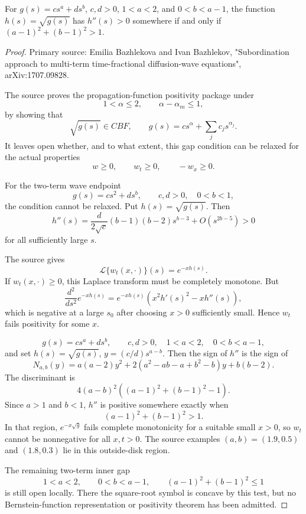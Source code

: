 \begin{lemma}
\label{res:sqrt-two-term-symbol-concavity-loss-criterion}
For \(g(s)=c s^a+d s^b\), \(c,d>0\), \(1<a<2\), and \(0<b<a-1\), the function \(h(s)=\sqrt{g(s)}\) has \(h''(s)>0\) somewhere if and only if \((a-1)^2+(b-1)^2>1\).
\end{lemma}
\begin{proof}
Primary source: Emilia Bazhlekova and Ivan Bazhlekov, "Subordination approach to multi-term time-fractional diffusion-wave equations", arXiv:1707.09828.

The source proves the propagation-function positivity package under
\[
1<\alpha\le2,\qquad \alpha-\alpha_m\le1,
\]
by showing that
\[
\sqrt{g(s)}\in CBF,\qquad g(s)=c s^\alpha+\sum_j c_j s^{\alpha_j}.
\]
It leaves open whether, and to what extent, this gap condition can be relaxed for the actual properties
\[
w\ge0,\qquad w_t\ge0,\qquad -w_x\ge0.
\]

For the two-term wave endpoint
\[
g(s)=c s^2+d s^b,\qquad c,d>0,\quad 0<b<1,
\]
the condition cannot be relaxed. Put \(h(s)=\sqrt{g(s)}\). Then
\[
h''(s)=\frac{d}{2\sqrt c}(b-1)(b-2)s^{b-3}+O(s^{2b-5})>0
\]
for all sufficiently large \(s\).

The source gives
\[
\mathcal L\{w_t(x,\cdot)\}(s)=e^{-xh(s)}.
\]
If \(w_t(x,\cdot)\ge0\), this Laplace transform must be completely monotone. But
\[
\frac{d^2}{ds^2}e^{-xh(s)}
=e^{-xh(s)}\left(x^2h'(s)^2-xh''(s)\right),
\]
which is negative at a large \(s_0\) after choosing \(x>0\) sufficiently small. Hence \(w_t\) fails positivity for some \(x\).

\[
g(s)=c s^a+d s^b,\qquad c,d>0,\quad 1<a<2,\quad 0<b<a-1,
\]
and set \(h(s)=\sqrt{g(s)}\), \(y=(c/d)s^{a-b}\). Then the sign of \(h''\) is the sign of
\[
N_{a,b}(y)
=a(a-2)y^2
+2(a^2-ab-a+b^2-b)y
+b(b-2).
\]
The discriminant is
\[
4(a-b)^2\left((a-1)^2+(b-1)^2-1\right).
\]
Since \(a>1\) and \(b<1\), \(h''\) is positive somewhere exactly when
\[
(a-1)^2+(b-1)^2>1.
\]
In that region, \(e^{-x\sqrt g}\) fails complete monotonicity for a suitable small \(x>0\), so \(w_t\) cannot be nonnegative for all \(x,t>0\). The source examples \((a,b)=(1.9,0.5)\) and \((1.8,0.3)\) lie in this outside-disk region.

The remaining two-term inner gap
\[
1<a<2,\qquad 0<b<a-1,\qquad (a-1)^2+(b-1)^2\le1
\]
is still open locally. There the square-root symbol is concave by this test, but no Bernstein-function representation or positivity theorem has been admitted.


\end{proof}
